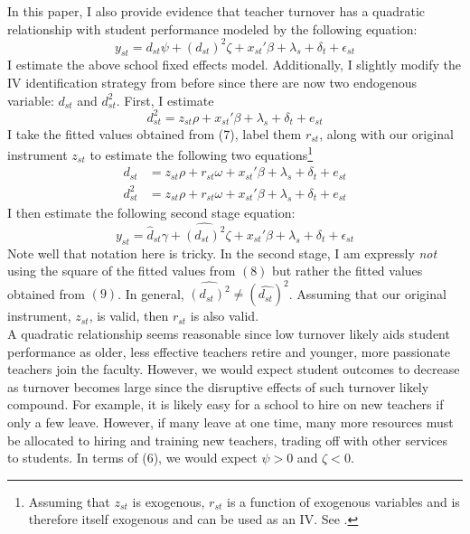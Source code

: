 \documentclass[12pt]{report}
\begin{document}
\indent In this paper, I also provide evidence that teacher turnover has a quadratic relationship with student performance modeled by the following equation:
\begin{equation}
y_{st} = {d}_{st}\psi + (d_{st})^2\zeta + x_{st}'\beta + \lambda_s + \delta_t + \epsilon_{st}
\end{equation} 
I estimate the above school fixed effects model. Additionally, I slightly modify the IV identification strategy from before since there are now two endogenous variable: $d_{st}$ and $d_{st}^2$. First, I estimate 
\begin{equation}
d^2_{st} = z_{st}\rho + x_{st}'\beta + \lambda_s + \delta_t + e_{st}
\end{equation}
I take the fitted values obtained from (7), label them $r_{st}$, along with our original instrument $z_{st}$ to estimate the following two equations\footnote{Assuming that $z_{st}$ is exogenous, $r_{st}$ is a function of exogenous variables and is therefore itself exogenous and can be used as an IV. See \cite{wooldridge}.}
\begin{align}
d_{st} & = z_{st}\rho + r_{st}\omega + x_{st}'\beta + \lambda_s + \delta_t + e_{st} \\
d^2_{st} & = z_{st}\rho + r_{st}\omega + x_{st}'\beta + \lambda_s + \delta_t + e_{st}
\end{align}
\noindent I then estimate the following second stage equation:
\begin{equation}
y_{st} = \hat{d}_{st}\gamma + \widehat{(d_{st})^2}\zeta + x_{st}'\beta + \lambda_s + \delta_t + \epsilon_{st}
\end{equation} 
\noindent Note well that notation here is tricky. In the second stage, I am expressly \textit{not} using the square of the fitted values from $(8)$ but rather the fitted values obtained from $(9)$. In general, $\widehat{(d_{st})^2}\not = (\hat{d_{st}})^2$. Assuming that our original instrument, $z_{st}$, is valid, then $r_{st}$ is also valid. \\
\indent A quadratic relationship seems reasonable since low turnover likely aids student performance as older, less effective teachers retire and younger, more passionate teachers join the faculty. However, we would expect student outcomes to decrease as turnover becomes large since the disruptive effects of such turnover likely compound. For example, it is likely easy for a school to hire on new teachers if only a few leave. However, if many leave at one time, many more resources must be allocated to hiring and training new teachers, trading off with other services to students. In terms of (6), we would expect $\psi>0$ and $\zeta < 0$.
\end{document}
